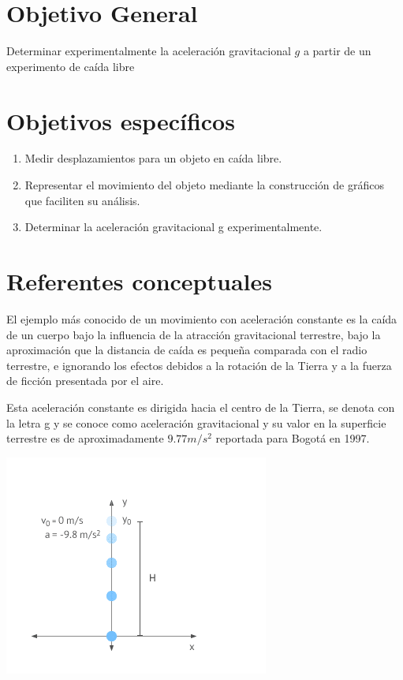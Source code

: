 \begin{multicols}{2}
\section*{Objetivo General}
\normalsize{Determinar experimentalmente la aceleración gravitacional \(g\) a partir de un experimento de caída libre}\\
\section*{Objetivos específicos}
\begin{enumerate}
    \item Medir desplazamientos para un objeto en caída libre.
    \item Representar el movimiento del objeto mediante la construcción de gráficos que faciliten su análisis.
    \item Determinar la aceleración gravitacional g experimentalmente.
\end{enumerate} 
\section*{Referentes conceptuales}
El ejemplo más conocido de un movimiento con aceleración constante es la caída de un cuerpo bajo la influencia de la atracción gravitacional terrestre, bajo la aproximación que la distancia de caída es pequeña comparada con el radio terrestre, e ignorando los efectos debidos a la rotación de la Tierra y a la fuerza de ficción presentada por el aire.

Esta aceleración constante es dirigida hacia el centro de la Tierra, se denota con la letra g y se conoce como aceleración gravitacional y su valor en la superficie terrestre es de aproximadamente $9.77 m/s^2$ reportada para Bogotá en 1997.

\begin{center}
    \includegraphics[scale=0.7]{fig/caida-libre.png}
\end{center}


\end{multicols}
